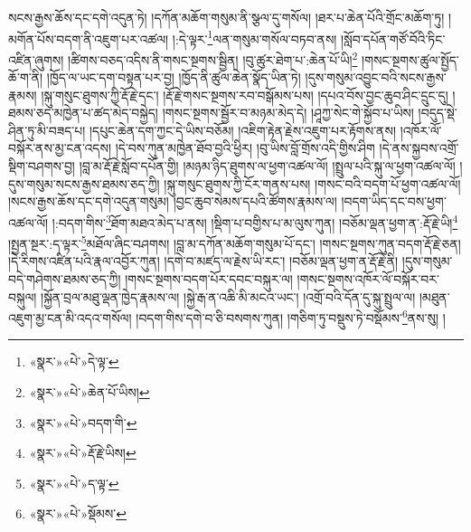 སངས་རྒྱས་ཆོས་དང་དགེ་འདུན་ཏེ། །དཀོན་མཆོག་གསུམ་ནི་སྩལ་དུ་གསོལ། །ཐར་པ་ཆེན་པོའི་གྲོང་མཆོག་ཏུ། །མགོན་པོས་བདག་ནི་འཇུག་པར་འཚལ། །:དེ་ལྟར་\footnote{«སྣར་»«པེ་»དེ་ལྟ་}ལན་གསུམ་གསོལ་བཏབ་ནས། །སློབ་དཔོན་གཙོ་བོའི་ཏིང་འཛིན་ཞུགས། །ཚིགས་བཅད་འདིས་ནི་གསང་སྔགས་སྦྱིན། །བུ་ཚུར་ཐེག་པ་:ཆེན་པོ་ཡི།\footnote{«སྣར་»«པེ་»ཆེན་པོ་ཡིས།} །གསང་སྔགས་ཚུལ་སྤྱོད་ཆོ་ག་ནི། །ཁྱོད་ལ་ཡང་དག་བསྟན་པར་བྱ། །ཁྱོད་ནི་ཚུལ་ཆེན་སྣོད་ཡིན་ཏེ། །དུས་གསུམ་འབྱུང་བའི་སངས་རྒྱས་རྣམས། །སྐུ་གསུང་ཐུགས་ཀྱི་རྡོ་རྗེ་དང་། །རྡོ་རྗེ་གསང་སྔགས་རབ་བསྒོམས་པས། །དཔའ་བོས་བྱང་ཆུབ་ཤིང་དྲུང་དུ། །ཐམས་ཅད་མཁྱེན་པ་ཚད་མེད་བསྐྱེད། །གསང་སྔགས་སྦྱོར་བ་མཉམ་མེད་དེ། །ཤཱཀྱ་སེང་གེ་སྐྱོབ་པ་ཡིས། །བདུད་སྡེ་ཤིན་ཏུ་མི་བཟད་པ། །དཔུང་ཆེན་དག་ཀྱང་དེ་ཡིས་བཅོམ། །འཇིག་རྟེན་རྗེས་འཇུག་པར་རྟོགས་ནས། །འཁོར་ལོ་བསྐོར་ནས་མྱ་ངན་འདས། །དེ་བས་ཀུན་མཁྱེན་ཐོབ་བྱའི་ཕྱིར། །བུ་ཡིས་བློ་གྲོས་འདི་གྱིས་ཤིག །དེ་ནས་སྐྱབས་འགྲོ་སྡིག་བཤགས་བྱ། །བླ་མ་རྡོ་རྗེ་སློབ་དཔོན་གྱི། །མཉམ་ཉིད་ཐུགས་ལ་ཕྱག་འཚལ་ལོ། །སྤྲུལ་པའི་སྐུ་ལ་ཕྱག་འཚལ་ལོ། །དུས་གསུམ་སངས་རྒྱས་ཐམས་ཅད་ཀྱི། །སྐུ་གསུང་ཐུགས་ཀྱི་ངོར་གནས་པས། །གསང་བའི་བདག་པོ་ཕྱག་འཚལ་ལོ། །སངས་རྒྱས་ཆོས་དང་དགེ་འདུན་གསུམ། །བྱང་ཆུབ་སེམས་དཔའི་ཚོགས་རྣམས་ལ། །བདག་ཡིད་དང་བས་ཕྱག་འཚལ་ལོ། །:བདག་གིས་\footnote{«སྣར་»«པེ་»བདག་གི་}ཐོག་མཐའ་མེད་པ་ནས། །སྡིག་པ་བགྱིས་པ་མ་ལུས་ཀུན། །བཅོམ་ལྡན་ཕྱག་ན་:རྡོ་རྗེ་ཡི།\footnote{«སྣར་»«པེ་»རྡོ་རྗེ་ཡིས།} །སྤྱན་སྔར་:ད་ལྟར་\footnote{«སྣར་»«པེ་»ད་ལྟ་}མཐོལ་ཞིང་བཤགས། །བླ་མ་དཀོན་མཆོག་གསུམ་པོ་དང་། །གསང་སྔགས་ཀུན་བདག་རྡོ་རྗེ་ཅན། །དེ་རིགས་འཛིན་པའི་རྣལ་འབྱོར་ཀུན། །དགེ་བ་མཛད་ལ་རྗེས་ཡི་རང་། །བཅོམ་ལྡན་ཕྱག་ན་རྡོ་རྗེ་ནི། །དུས་གསུམ་བདེ་གཤེགས་ཐམས་ཅད་ཀྱི། །གསང་སྔགས་བདག་པོར་དབང་བསྐུར་ལ། །གསང་སྔགས་འཁོར་ལོ་བསྐོར་བར་བསྐུལ། །སྐྱོན་བྲལ་མཐུ་ལྡན་ཁྱེད་རྣམས་ལ། །སྐྱེ་རྒ་ན་འཆི་མི་མངའ་ཡང་། །འགྲོ་བའི་དོན་དུ་སྐུ་སྤྲུལ་ལ། །མཐུན་འཇུག་མྱ་ངན་མི་འདའ་གསོལ། །བདག་གིས་དགེ་བ་ཅི་བསགས་ཀུན། །གཅིག་ཏུ་བསྡུས་ཏེ་བསྡོམས་\footnote{«སྣར་»«པེ་»སྡོམས་}ནས་སུ། །
